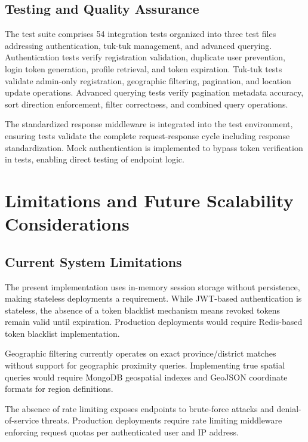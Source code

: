 \documentclass[12pt,a4paper]{article}
\begin{document}
\subsection{Testing and Quality Assurance}

The test suite comprises 54 integration tests organized into three test files addressing authentication, tuk-tuk management, and advanced querying. Authentication tests verify registration validation, duplicate user prevention, login token generation, profile retrieval, and token expiration. Tuk-tuk tests validate admin-only registration, geographic filtering, pagination, and location update operations. Advanced querying tests verify pagination metadata accuracy, sort direction enforcement, filter correctness, and combined query operations.

The standardized response middleware is integrated into the test environment, ensuring tests validate the complete request-response cycle including response standardization. Mock authentication is implemented to bypass token verification in tests, enabling direct testing of endpoint logic.

\section{Limitations and Future Scalability Considerations}

\subsection{Current System Limitations}

The present implementation uses in-memory session storage without persistence, making stateless deployments a requirement. While JWT-based authentication is stateless, the absence of a token blacklist mechanism means revoked tokens remain valid until expiration. Production deployments would require Redis-based token blacklist implementation.

Geographic filtering currently operates on exact province/district matches without support for geographic proximity queries. Implementing true spatial queries would require MongoDB geospatial indexes and GeoJSON coordinate formats for region definitions.

The absence of rate limiting exposes endpoints to brute-force attacks and denial-of-service threats. Production deployments require rate limiting middleware enforcing request quotas per authenticated user and IP address.
\end{document}
